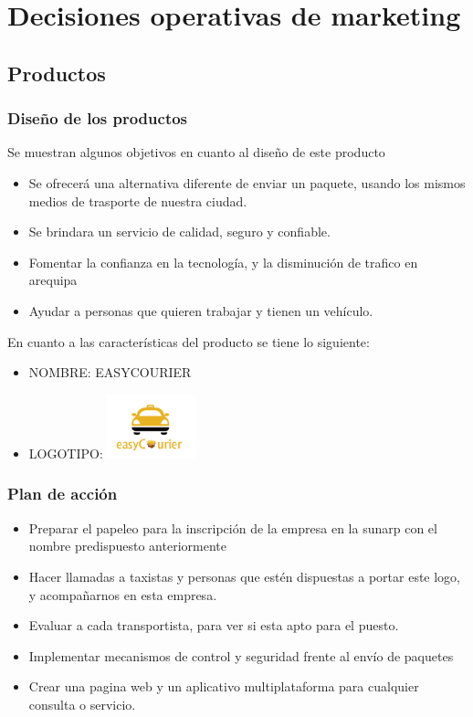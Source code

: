 \chapter{Decisiones operativas de marketing}

\section{Productos}

\subsection{Diseño de los productos}
Se muestran algunos objetivos en cuanto al diseño de este producto
\begin{itemize}
\item Se ofrecerá una alternativa diferente de enviar un paquete, usando los mismos medios de trasporte de nuestra ciudad.
\item Se brindara un servicio de calidad, seguro y confiable.
\item Fomentar la confianza en la tecnología, y la disminución de trafico en arequipa
\item Ayudar a personas que quieren trabajar y tienen un vehículo.
\end{itemize}
En cuanto a las características del producto se tiene lo siguiente:
\begin{itemize}
\item NOMBRE:    EASYCOURIER
\item LOGOTIPO: \includegraphics[width=0.2\textwidth]{easycourier}
\end{itemize}

\subsection{Plan de acción}
\begin{itemize}
\item Preparar el papeleo para la inscripción de la empresa en la sunarp con el nombre predispuesto anteriormente
\item Hacer llamadas a taxistas y personas que estén dispuestas a portar este logo, y acompañarnos en esta empresa.
\item Evaluar a cada transportista, para ver si esta apto para el puesto.
\item Implementar mecanismos de control y seguridad frente al envío de paquetes
\item Crear una pagina web y un aplicativo multiplataforma para cualquier consulta o servicio.
\end{itemize}

